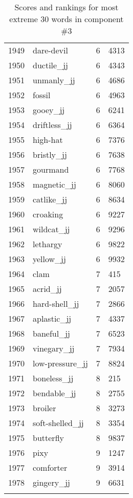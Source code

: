 \begin{longtable}[!htbp]{| rlr@{.}l |}
    1949 & dare-devil & 6 & 4313 \\
    1950 & ductile\_jj & 6 & 4343 \\
    1951 & unmanly\_jj & 6 & 4686 \\
    1952 & fossil & 6 & 4963 \\
    1953 & gooey\_jj & 6 & 6241 \\
    1954 & driftless\_jj & 6 & 6364 \\
    1955 & high-hat & 6 & 7376 \\
    1956 & bristly\_jj & 6 & 7638 \\
    1957 & gourmand & 6 & 7768 \\
    1958 & magnetic\_jj & 6 & 8060 \\
    1959 & catlike\_jj & 6 & 8634 \\
    1960 & croaking & 6 & 9227 \\
    1961 & wildcat\_jj & 6 & 9296 \\
    1962 & lethargy & 6 & 9822 \\
    1963 & yellow\_jj & 6 & 9932 \\
    1964 & clam & 7 & 415 \\
    1965 & acrid\_jj & 7 & 2057 \\
    1966 & hard-shell\_jj & 7 & 2866 \\
    1967 & aplastic\_jj & 7 & 4337 \\
    1968 & baneful\_jj & 7 & 6523 \\
    1969 & vinegary\_jj & 7 & 7934 \\
    1970 & low-pressure\_jj & 7 & 8824 \\
    1971 & boneless\_jj & 8 & 215 \\
    1972 & bendable\_jj & 8 & 2755 \\
    1973 & broiler & 8 & 3273 \\
    1974 & soft-shelled\_jj & 8 & 3354 \\
    1975 & butterfly & 8 & 9837 \\
    1976 & pixy & 9 & 1247 \\
    1977 & comforter & 9 & 3914 \\
    1978 & gingery\_jj & 9 & 6631 \\
    \hline
    \caption{Scores and rankings for most extreme 30 words in component \#3} \\
\end{longtable}
